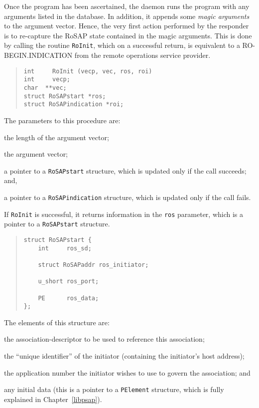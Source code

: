 Once the program has been ascertained,
the daemon runs the program with any arguments listed in the database.
In addition,
it appends some {\em magic arguments\/} to the argument vector.
Hence,
the very first action performed by the responder is to re-capture the RoSAP
state contained in the magic arguments.
This is done by calling the routine \verb"RoInit",
which on a successful return,
is equivalent to a {\sf RO-BEGIN.INDICATION\/} from the remote operations
service provider.
\begin{quote}\small\begin{verbatim}
int     RoInit (vecp, vec, ros, roi)
int     vecp;
char  **vec;
struct RoSAPstart *ros;
struct RoSAPindication *roi;
\end{verbatim}\end{quote}
The parameters to this procedure are:
\begin{describe}
\item[\verb"vecp":] the length of the argument vector;

\item[\verb"vec":] the argument vector;

\item[\verb"ros":] a pointer to a \verb"RoSAPstart" structure, which is
updated only if the call succeeds;
and,

\item[\verb"roi":] a pointer to a \verb"RoSAPindication" structure, which is
updated only if the call fails.
\end{describe}
If \verb"RoInit" is successful,
it returns information in the \verb"ros" parameter,
which is a pointer to a \verb"RoSAPstart" structure.
\begin{quote}\small\begin{verbatim}
struct RoSAPstart {
    int     ros_sd;

    struct RoSAPaddr ros_initiator;

    u_short ros_port;

    PE      ros_data;
};
\end{verbatim}\end{quote}
The elements of this structure are:
\begin{describe}
\item[\verb"ros\_sd":] the association-descriptor to be used to
reference this association;

\item[\verb"ros\_initiator":] the ``unique identifier'' of the initiator
(containing the initiator's host address);

\item[\verb"ros\_port":] the application number the initiator wishes to use
to govern the association;
and

\item[\verb"ros\_data":] any initial data (this is a pointer to a
\verb"PElement" structure, which is fully explained in Chapter~\ref{libpsap}).
\end{describe}
